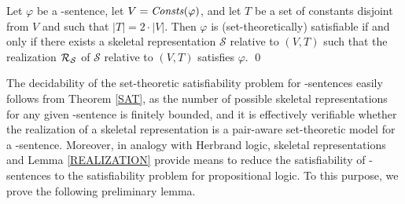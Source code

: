 \documentclass[a4paper]{llncs}
\newcommand{\atset}{\mathcal{S}}
\newcommand{\subst}[3]{#1[#2\rightarrow#3]}
\begin{document}

%
%

\begin{theorem}\label{SAT}
Let $\varphi$ be a \Forallpizero-sentence, let $V=\mathit{Consts}(\varphi)$,
and let $T$ be a set of constants disjoint from $V$ and such that
$|T|=2\cdot|V|$. Then $\varphi$ is (set-theoretically) satisfiable
if and only if there exists a skeletal representation $\atset$
relative to $(V,T)$ such that the realization $\Realization_{\!\atset}$
of $\atset$ relative to $(V,T)$ satisfies $\varphi$. \qed
\end{theorem}
%
The decidability of the set-theoretic satisfiability problem for
\Forallpizero-sentences easily follows from Theorem \ref{SAT}, as the
number of possible skeletal representations for any given
\Forallpizero-sentence is finitely bounded, and it is effectively
verifiable whether the realization of a skeletal representation is a
pair-aware set-theoretic model for a \Forallpizero-sentence.
Moreover, in analogy with Herbrand logic, skeletal representations
and Lemma \ref{REALIZATION} provide means to reduce the satisfiability
of \Forallpizero-sentences to the satisfiability problem for 
propositional logic. To this purpose, we prove the following 
preliminary lemma.
\end{document}
